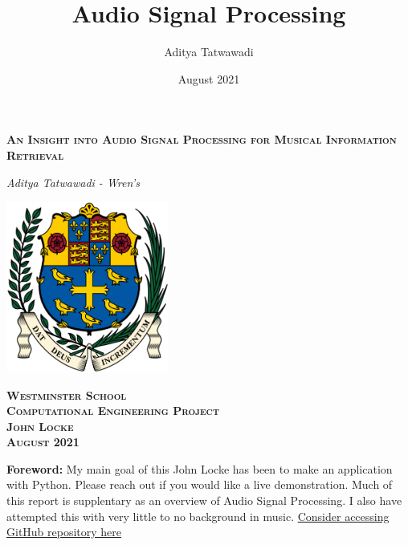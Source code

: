 \documentclass[a4paper,12pt]{article}
\author{Aditya Tatwawadi}
\title{Audio Signal Processing}
\date{August 2021}
\begin{document}
    \begin{titlepage}
        \begin{center}
            \vspace*{1cm}
    
            \LARGE
            \textsc{\textbf{An Insight into Audio Signal Processing for Musical Information Retrieval}}
    
            \vspace{0.5cm}
                
            \textit{Aditya Tatwawadi - Wren's}
                
            \vspace{4cm}
            \LARGE
            \includegraphics[width=0.4\textwidth]{westminsterschool}
            
            \Large
            \textsc{\textbf{
            Westminster School\\
            Computational Engineering Project\\
            John Locke\\
            August 2021}}
                
        \end{center}
    \end{titlepage}


    \footnotesize \singlespacing
        \noindent \textbf{Foreword:} My main goal of this John Locke has been to make an application with Python. Please reach out if you would like a live demonstration. Much of this report is supplentary as an overview of Audio Signal Processing. I also have attempted this with very little to no background in music.
        \newline
        \href{https://github.com/aditya-tatwawadi/Audio-Signal-Processing}{Consider accessing GitHub repository here \parencite{GitHubRepo}}
    \doublespacing
    \normalsize
    \tableofcontents
    \lstlistoflistings 
    \singlespacing
    \normalsize
     
\end{document}
